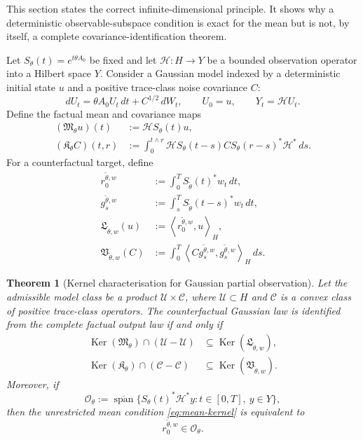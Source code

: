 \documentclass[11pt]{article}
\newtheorem{theorem}[assumption]{Theorem}
\theoremstyle{remark}
\newcommand{\Ker}{\operatorname{Ker}}
\newcommand{\ip}[2]{\left\langle #1,#2\right\rangle_H}
\newcommand{\1}{\mathbf 1}
\begin{document}
This section states the correct infinite-dimensional principle.  It shows why a deterministic observable-subspace condition is exact for the mean but is not, by itself, a complete covariance-identification theorem.

Let $S_\theta(t)=e^{t\theta A_0}$ be fixed and let $\mathcal H:H\to Y$ be a bounded observation operator into a Hilbert space $Y$.  Consider a Gaussian model indexed by a deterministic initial state $u$ and a positive trace-class noise covariance $C$:
\[
 dU_t=\theta A_0U_t\,dt+C^{1/2}\,dW_t,
 \qquad U_0=u,
 \qquad Y_t=\mathcal HU_t.
\]
Define the factual mean and covariance maps
\begin{align}
 (\mathfrak M_\theta u)(t)
 &:=\mathcal H S_\theta(t)u,\label{eq:M-map}\\
 (\mathfrak K_\theta C)(t,r)
 &:=\int_0^{t\wedge r}
 \mathcal H S_\theta(t-s)C
 S_\theta(r-s)^*\mathcal H^*\,ds.\label{eq:K-map}
\end{align}
For a counterfactual target, define
\begin{align}
 r_0^{\widetilde\theta,w}
 &:=\int_0^T S_{\widetilde\theta}(t)^*w_t\,dt,\label{eq:r0}\\
 g_s^{\widetilde\theta,w}
 &:=\int_s^T S_{\widetilde\theta}(t-s)^*w_t\,dt,\label{eq:gs-abstract}\\
 \mathfrak L_{\widetilde\theta,w}(u)
 &:=\ip{r_0^{\widetilde\theta,w}}{u},\label{eq:L-map}\\
 \mathfrak V_{\widetilde\theta,w}(C)
 &:=\int_0^T\ip{C g_s^{\widetilde\theta,w}}{g_s^{\widetilde\theta,w}}\,ds.\label{eq:V-map}
\end{align}

\begin{theorem}[Kernel characterisation for Gaussian partial observation]\label{thm:operator-kernel}
Let the admissible model class be a product $\mathcal U\times\mathcal C$, where $\mathcal U\subset H$ and $\mathcal C$ is a convex class of positive trace-class operators.  The counterfactual Gaussian law is identified from the complete factual output law if and only if
\begin{align}
 \Ker(\mathfrak M_\theta)\cap(\mathcal U-\mathcal U)
 &\subseteq\Ker(\mathfrak L_{\widetilde\theta,w}),\label{eq:mean-kernel}\\
 \Ker(\mathfrak K_\theta)\cap(\mathcal C-\mathcal C)
 &\subseteq\Ker(\mathfrak V_{\widetilde\theta,w}).\label{eq:cov-kernel}
\end{align}
Moreover, if
\[
 \mathcal O_\theta
 :=\overline{\operatorname{span}}
 \{S_\theta(t)^*\mathcal H^*y:
 t\in[0,T],\ y\in Y\},
\]
then the unrestricted mean condition \eqref{eq:mean-kernel} is equivalent to
\begin{equation}\label{eq:r-in-O}
 r_0^{\widetilde\theta,w}\in\mathcal O_\theta.
\end{equation}
\end{theorem}
\end{document}
